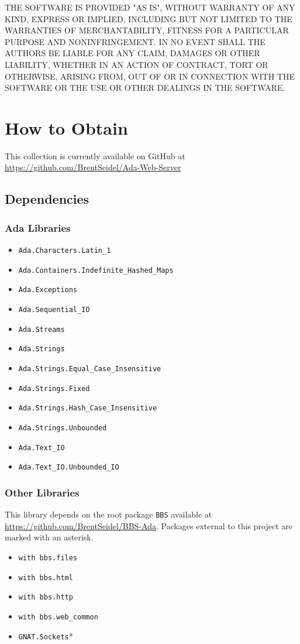 \documentclass[10pt, openany]{book}
\newcommand{\package}[1]{\texttt{#1}}
\begin{document}
THE SOFTWARE IS PROVIDED "AS IS", WITHOUT WARRANTY OF ANY KIND, EXPRESS OR IMPLIED, INCLUDING BUT NOT LIMITED TO THE WARRANTIES OF MERCHANTABILITY, FITNESS FOR A PARTICULAR PURPOSE AND NONINFRINGEMENT. IN NO EVENT SHALL THE AUTHORS BE LIABLE FOR ANY CLAIM, DAMAGES OR OTHER LIABILITY, WHETHER IN AN ACTION OF CONTRACT, TORT OR OTHERWISE, ARISING FROM, OUT OF OR IN CONNECTION WITH THE SOFTWARE OR THE USE OR OTHER DEALINGS IN THE SOFTWARE.

\chapter{How to Obtain}
This collection is currently available on GitHub at \url{https://github.com/BrentSeidel/Ada-Web-Server}

\section{Dependencies}
\subsection{Ada Libraries}
\begin{itemize}
  \item \package{Ada.Characters.Latin\_1}
  \item \package{Ada.Containers.Indefinite\_Hashed\_Maps}
  \item \package{Ada.Exceptions}
  \item \package{Ada.Sequential\_IO}
  \item \package{Ada.Streams}
  \item \package{Ada.Strings}
  \item \package{Ada.Strings.Equal\_Case\_Insensitive}
  \item \package{Ada.Strings.Fixed}
  \item \package{Ada.Strings.Hash\_Case\_Insensitive}
  \item \package{Ada.Strings.Unbounded}
  \item \package{Ada.Text\_IO}
  \item \package{Ada.Text\_IO.Unbounded\_IO}
\end{itemize}

\subsection{Other Libraries}
This library depends on the root package \package{BBS} available at \url{https://github.com/BrentSeidel/BBS-Ada}.  Packages external to this project are marked with an asterisk.
\begin{itemize}
  \item \package{with bbs.files}
  \item \package{with bbs.html}
  \item \package{with bbs.http}
  \item \package{with bbs.web\_common}
  \item \package{GNAT.Sockets}*
\end{itemize}
\end{document}
